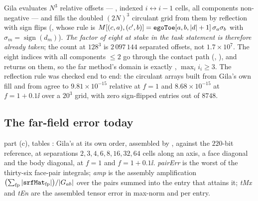 Gila evaluates $N^3$ relative offsets --- , indexed $i \leftrightarrow i-1$
cells, all components non-negative --- and fills the doubled $(2N)^3$ circulant grid from
them by reflection with sign flips (, whose rule is
$M[(c,a),(c',b)] = \texttt{egoToe}[a,b,|d|+1]\,\sigma_a\sigma_b$ with
$\sigma_m = \operatorname{sign}(d_m)$). \emph{The factor of eight at stake in the task
statement is therefore already taken}; the count at $128^3$ is $2\,097\,144$ separated
offsets, not $1.7\times10^{7}$. The eight indices with all components $\le 2$ go through
the contact path (, ), and  returns
 on them, so the far method's domain is exactly , $\max_i i_i \ge
3$. The reflection rule was checked end to end: the circulant arrays built from Gila's own
fill and from  agree to $9.81\times10^{-15}$ relative at $f = 1$ and
$8.68\times10^{-15}$ at $f = 1+0.1\ii$ over a $20^3$ grid, with zero sign-flipped entries
out of $8748$.

\subsection{The far-field error today}
\label{sec:grd:err}

 part (c), tables : Gila's
 at its own  order, assembled by , against the
$220$-bit reference, at separations $2,3,4,6,8,16,32,64$ cells along an axis, a face
diagonal and the body diagonal, at $f = 1$ and $f = 1+0.1\ii$. \emph{pairErr} is the worst
of the thirty-six face-pair integrals; \emph{amp} is the assembly amplification
$\bigl(\sum_{\mathrm{fp}}|\texttt{srfMat}_{\mathrm{fp}}|\bigr)/|G_{ab}|$ over the pairs summed
into the entry that attains it; \emph{tMx} and \emph{tEn} are the assembled tensor error in
max-norm and per entry.

